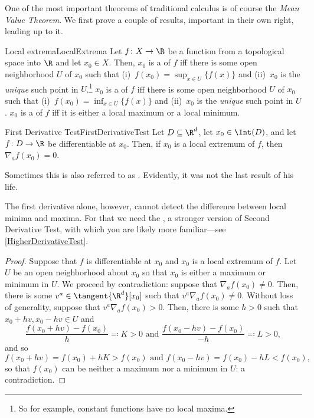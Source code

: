 One of the most important theorems of traditional calculus is of course the \emph{Mean Value Theorem}.  We first prove a couple of results, important in their own right, leading up to it.
\begin{dfn}{Local extrema}{LocalExtrema}
Let $f\colon X\rightarrow \R$ be a function from a topological space into $\R$ and let $x_0\in X$.  Then, $x_0$ is a  of $f$ iff there is some open neighborhood $U$ of $x_0$ such that (i)~$f(x_0)=\sup _{x\in U}\{ f(x)\}$ and (ii)~$x_0$ is the \emph{unique} such point in $U$.\footnote{So for example, constant functions have no local maxima.}  $x_0$ is a  of $f$ iff there is some open neighborhood $U$ of $x_0$ such that (i)~$f(x_0)=\inf _{x\in U}\{ f(x)\}$ and (ii)~$x_0$ is the \emph{unique} such point in $U$.  $x_0$ is a  of $f$ iff it is either a local maximum or a local minimum.
\end{dfn}
\begin{prp}{First Derivative Test}{FirstDerivativeTest}
Let $D\subseteq \R ^d$, let $x_0\in \Int (D)$, and let $f\colon D\rightarrow \R$ be differentiable at $x_0$.  Then, if $x_0$ is a local extremum of $f$, then $\nabla _af(x_0)=0$.
\begin{rmk}
Sometimes this is also referred to as .  Evidently, it was not the last result of his life.
\end{rmk}
\begin{rmk}
The first derivative alone, however, cannot detect the difference between local minima and maxima.  For that we need the \emph{}, a stronger version of Second Derivative Test, with which you are likely more familiar---see \cref{HigherDerivativeTest}.
\end{rmk}
\begin{proof}
Suppose that $f$ is differentiable at $x_0$ and $x_0$ is a local extremum of $f$.  Let $U$ be an open neighborhood about $x_0$ so that $x_0$ is either a maximum or minimum in $U$.  We proceed by contradiction:  suppose that $\nabla _af(x_0)\neq 0$.  Then, there is some $v^a\in \tangent{\R ^d}[x_0]$ such that $v^a\nabla _af(x_0)\neq 0$.  Without loss of generality, suppose that $v^a\nabla _af(x_0)>0$.  Then, there is some $h>0$ such that $x_0+hv,x_0-hv\in U$ and
{\scriptsize
\begin{equation}
\frac{f(x_0+hv)-f(x_0)}{h}\eqqcolon K>0\text{ and }\frac{f(x_0-hv)-f(x_0)}{-h}\eqqcolon L>0,
\end{equation}
}
and so
{\scriptsize
\begin{equation}
f(x_0+hv)=f(x_0)+hK>f(x_0)\text{ and }f(x_0-hv)=f(x_0)-hL<f(x_0),
\end{equation}
}
so that $f(x_0)$ can be neither a maximum nor a minimum in $U$:  a contradiction.
\end{proof}
\end{prp}
